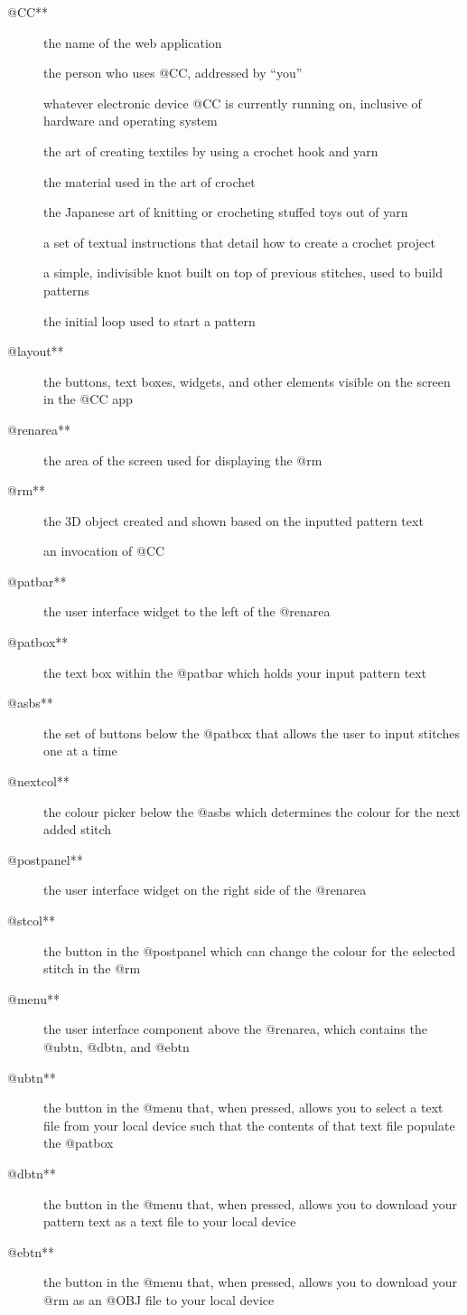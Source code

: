 \documentclass[main.tex]{subfiles}
\begin{document}
\begin{description}
\item[@CC**] the name of the web application
\item[] the person who uses @CC, addressed by ``you''
\item[] whatever electronic device @CC is currently running on, inclusive of hardware and operating system

\item[] the art of creating textiles by using a crochet hook and yarn
\item[] the material used in the art of crochet
\item[] the Japanese art of knitting or crocheting stuffed toys out of yarn
\item[] a set of textual instructions that detail how to create a crochet project
\item[] a simple, indivisible knot built on top of previous stitches, used to build patterns
\item[] the initial loop used to start a pattern

\item[@layout**] the buttons, text boxes, widgets, and other elements visible on the screen in the @CC app
\item[@renarea**] the area of the screen used for displaying the @rm
\item[@rm**] the 3D object created and shown based on the inputted pattern text
\item[] an invocation of @CC
\item[@patbar**] the user interface widget to the left of the @renarea
\item[@patbox**] the text box within the @patbar which holds your input pattern text
\item[@asbs**] the set of buttons below the @patbox that allows the user to input stitches one at a time
\item[@nextcol**] the colour picker below the @asbs which determines the colour for the next added stitch
\item[@postpanel**] the user interface widget on the right side of the @renarea
\item[@stcol**] the button in the @postpanel which can change the colour for the selected stitch in the @rm
\item[@menu**] the user interface component above the @renarea, which contains the @ubtn, @dbtn, and @ebtn
\item[@ubtn**] the button in the @menu that, when pressed, allows you to select a text file from your local device such that the contents of that text file populate the @patbox
\item[@dbtn**] the button in the @menu that, when pressed, allows you to download your pattern text as a text file to your local device
\item[@ebtn**] the button in the @menu that, when pressed, allows you to download your @rm as an @OBJ file to your local device
\end{description}
\end{document}
